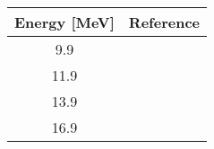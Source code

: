 \begin{tabular}{c c} 
    \toprule 
    \bf{Energy [MeV]} & \bf{Reference} \\
    \midrule
    9.9 & \cite{Tornow82}\\
    11.9 & \cite{Tornow82}\\
    13.9 & \cite{Honore86}\\
    16.9 & \cite{Honore86}\\
    \bottomrule
\end{tabular}
